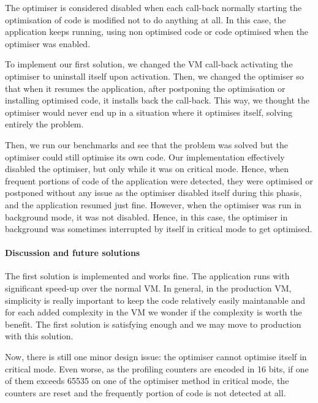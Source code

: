\documentclass[a4paper,12pt,twoside]{../includes/ThesisStyle}
\begin{document}
The optimiser is considered disabled when each call-back normally starting the optimisation of code is modified not to do anything at all. In this case, the application keeps running, using non optimised code or code optimised when the optimiser was enabled.

To implement our first solution, we changed the VM call-back activating the optimiser to uninstall itself upon activation. Then, we changed the optimiser so that when it resumes the application, after postponing the optimisation or installing optimised code, it installs back the call-back. This way, we thought the optimiser would never end up in a situation where it optimises itself, solving entirely the problem.

Then, we run our benchmarks and see that the problem was solved but the optimiser could still optimise its own code. Our implementation effectively disabled the optimiser, but only while it was on critical mode. Hence, when frequent portions of code of the application were detected, they were optimised or postponed without any issue as the optimiser disabled itself during this phasis, and the application resumed just fine. However, when the optimiser was run in background mode, it was not disabled. Hence, in this case, the optimiser in background was sometimes interrupted by itself in critical mode to get optimised.

\paragraph{Discussion and future solutions}

The first solution is implemented and works fine. The application runs with significant speed-up over the normal VM. In general, in the production VM, simplicity is really important to keep the code relatively easily maintanable and for each added complexity in the VM we wonder if the complexity is worth the benefit. The first solution is satisfying enough and we may move to production with this solution.

Now, there is still one minor design issue: the optimiser cannot optimise itself in critical mode. Even worse, as the profiling counters are encoded in 16 bits, if one of them exceeds 65535 on one of the optimiser method in critical mode, the counters are reset and the frequently portion of code is not detected at all.
\end{document}
